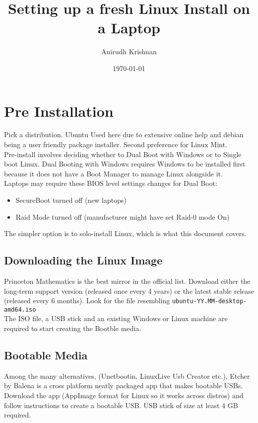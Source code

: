 \documentclass[10pt,letterpaper,twocolumn]{article}
\title{Setting up a fresh Linux Install on a Laptop}
\author{Anirudh Krishnan}
\date{\today}
\begin{document}
\maketitle
\newpage

\tableofcontents
\newpage

\section{Pre Installation}

Pick a distribution. Ubuntu Used here due to extensive online help and debian being a user friendly package installer. Second preference for Linux Mint. \\

Pre-install involves deciding whether to Dual Boot with Windows or to Single boot Linux. Dual Booting with Windows requires Windows to be installed first because it does not have a Boot Manager to manage Linux alongside it. \\

Laptops may require these BIOS level settings changes for Dual Boot:

\begin{itemize}
	\item SecureBoot turned off (new laptops)
	\item Raid Mode turned off (manufacturer might have set Raid-0 mode On)
\end{itemize}

The simpler option is to solo-install Linux, which is what this document covers.

\subsection{Downloading the Linux Image}

Princeton Mathematics is the best mirror in the official list. Download either the long-term support version (released once every 4 years) or the latest stable release (released every 6 months). Look for the file resembling \texttt{ubuntu-YY.MM-desktop-amd64.iso} \\

The ISO file, a USB stick and an existing Windows or Linux machine are required to start creating the Bootble media.



\subsection{Bootable Media}
Among the many alternatives, (Unetbootin, LinuxLive Usb Creator etc.), Etcher by Balena is a cross platform neatly packaged app that makes bootable USBs. Download the app (AppImage format for Linux so it works across distros) and follow instructions to create a bootable USB. USB stick of size at least 4 GB required.\\
\end{document}
